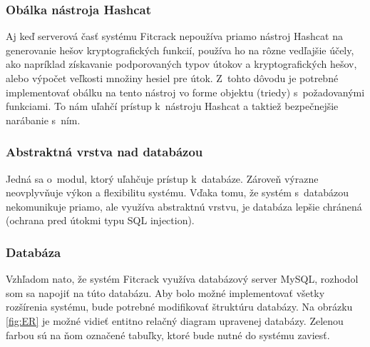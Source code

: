 \documentclass[slovak]{fitthesis}
\begin{document}
\subsubsection{Obálka nástroja Hashcat}
Aj keď serverová časť systému Fitcrack nepoužíva priamo nástroj Hashcat na generovanie hešov kryptografických funkcií, používa ho na rôzne vedľajšie účely, ako napríklad získavanie podporovaných typov útokov a kryptografických hešov, alebo výpočet veľkosti množiny hesiel pre útok. Z~tohto dôvodu je potrebné implementovať obálku na tento nástroj vo forme objektu (triedy) s~požadovanými funkciami. To nám uľahčí prístup k~nástroju Hashcat a taktiež bezpečnejšie narábanie s~ním.

\subsubsection{Abstraktná vrstva nad databázou}
Jedná sa o~modul, ktorý uľahčuje prístup k~databáze. Zároveň výrazne neovplyvňuje výkon a flexibilitu systému. Vďaka tomu, že systém s~databázou nekomunikuje priamo, ale využíva abstraktnú vrstvu, je databáza lepšie chránená (ochrana pred útokmi typu SQL injection).


\subsubsection{Databáza}\label{navrhDB}
Vzhľadom nato, že systém Fitcrack využíva databázový server MySQL, rozhodol som sa napojiť na túto databázu. Aby bolo možné implementovať všetky rozšírenia systému, bude potrebné modifikovať štruktúru databázy. Na obrázku \ref{fig:ER} je možné vidieť entitno relačný diagram upravenej databázy. Zelenou farbou sú na ňom označené tabuľky, ktoré bude nutné do systému zaviesť. 
\end{document}
